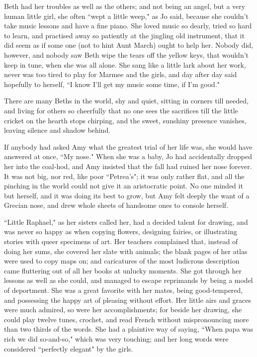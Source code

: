 Beth had her troubles as well as the others; and not being an angel, but
a very human little girl, she often ``wept a little weep," as Jo said,
because she couldn't take music lessons and have a fine
piano. She loved music so dearly, tried so hard to learn, and practised
away so patiently at the jingling old instrument, that it did seem as if
some one (not to hint Aunt March) ought to help her. Nobody did,
however, and nobody saw Beth wipe the tears off the yellow keys, that
wouldn't keep in tune, when she was all alone. She sang
like a little lark about her work, never was too tired to play for
Marmee and the girls, and day after day said hopefully to herself, ``I
know I'll get my music some time, if I'm
good."

There are many Beths in the world, shy and quiet, sitting in corners
till needed, and living for others so cheerfully that no one sees the
sacrifices till the little cricket on the hearth stops chirping, and the
sweet, sunshiny presence vanishes, leaving silence and shadow behind.

If anybody had asked Amy what the greatest trial of her life was, she
would have answered at once, ``My nose." When she was a baby, Jo had
accidentally dropped her into the coal-hod, and Amy insisted that the
fall had ruined her nose forever. It was not big, nor red, like poor
``Petrea's"; it was only rather flat, and all the
pinching in the world could not give it an aristocratic point. No one
minded it but herself, and it was doing its best to grow, but Amy felt
deeply the want of a Grecian nose, and drew whole sheets of handsome
ones to console herself.

``Little Raphael," as her sisters called her, had a decided talent for
drawing, and was never so happy as when copying flowers, designing
fairies, or illustrating stories with queer specimens of art. Her
teachers complained that, instead of doing her sums, she covered her
slate with animals; the blank pages of her atlas were used to copy maps
on; and caricatures of the most ludicrous description came fluttering
out of all her books at unlucky moments. She got through her lessons as
well as she could, and managed to escape reprimands by being a model of
deportment. She was a great favorite with her mates, being
good-tempered, and possessing the happy art of pleasing without effort.
Her little airs and graces were much admired, so were her
accomplishments; for beside her drawing, she could play twelve tunes,
crochet, and read French without mispronouncing more than two thirds of
the words. She had a plaintive way of saying, ``When papa was rich we did
so-and-so," which was very touching; and her long words were considered
``perfectly elegant" by the girls.

